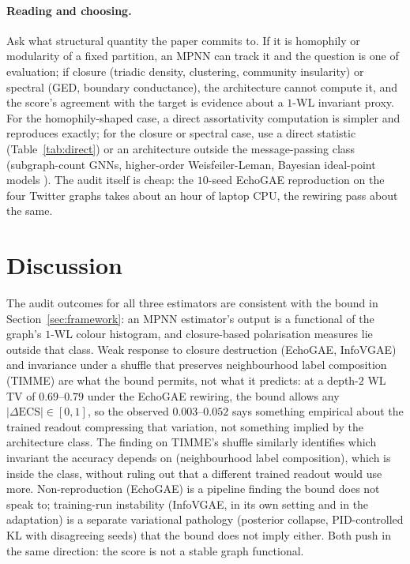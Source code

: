 \documentclass[letterpaper]{article} %
\begin{document}
\paragraph{Reading and choosing.} Ask what structural
quantity the paper commits to. If it is homophily or
modularity of a fixed partition, an MPNN can track it and the
question is one of evaluation; if closure (triadic density,
clustering, community insularity) or spectral (GED, boundary
conductance), the architecture cannot compute it, and the
score's agreement with the target is evidence about a $1$-WL
invariant proxy. For the homophily-shaped case, a direct
assortativity computation is simpler and reproduces exactly;
for the closure or spectral case, use a direct statistic
(Table~\ref{tab:direct}) or an architecture outside the
message-passing class (subgraph-count GNNs, higher-order
Weisfeiler-Leman, Bayesian ideal-point models
\citep{Barbera2015}). The audit itself is cheap: the $10$-seed
EchoGAE reproduction on the four Twitter graphs takes about
an hour of laptop CPU, the rewiring pass about the same.

\section{Discussion}\label{sec:discussion}

The audit outcomes for all three estimators are consistent
with the bound in Section~\ref{sec:framework}: an MPNN
estimator's output is a functional of the graph's $1$-WL
colour histogram, and closure-based polarisation measures lie
outside that class. Weak response to closure destruction
(EchoGAE, InfoVGAE) and invariance under a shuffle that
preserves neighbourhood label composition (TIMME) are what
the bound permits, not what it predicts: at a depth-$2$ WL TV
of $0.69$--$0.79$ under the EchoGAE rewiring, the bound
allows any $|\Delta \mathrm{ECS}| \in [0, 1]$, so the observed
$0.003$--$0.052$ says something empirical about the trained
readout compressing that variation, not something implied by
the architecture class. The finding on TIMME's shuffle
similarly identifies which invariant the accuracy depends on
(neighbourhood label composition), which is inside the class,
without ruling out that a different trained readout would use
more. Non-reproduction
(EchoGAE) is a pipeline finding the bound does not speak to;
training-run instability (InfoVGAE, in its own setting and in
the adaptation) is a separate variational pathology (posterior
collapse, PID-controlled KL with disagreeing seeds) that the
bound does not imply either. Both
push in the same direction: the score is not a stable graph
functional.
\end{document}
